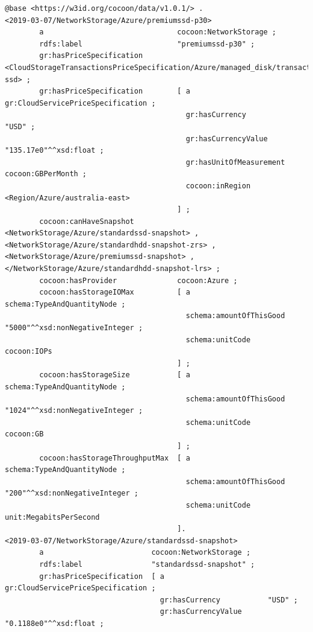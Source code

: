 \begin{lstlisting}[caption={Storage},label={lst:Storage}]
@base <https://w3id.org/cocoon/data/v1.0.1/> .
<2019-03-07/NetworkStorage/Azure/premiumssd-p30>
        a                               cocoon:NetworkStorage ;
        rdfs:label                      "premiumssd-p30" ;
        gr:hasPriceSpecification        <CloudStorageTransactionsPriceSpecification/Azure/managed_disk/transactions-ssd> ;
        gr:hasPriceSpecification        [ a                        gr:CloudServicePriceSpecification ;
                                          gr:hasCurrency           "USD" ;
                                          gr:hasCurrencyValue      "135.17e0"^^xsd:float ;
                                          gr:hasUnitOfMeasurement  cocoon:GBPerMonth ;
                                          cocoon:inRegion         <Region/Azure/australia-east>
                                        ] ;
        cocoon:canHaveSnapshot          <NetworkStorage/Azure/standardssd-snapshot> , <NetworkStorage/Azure/standardhdd-snapshot-zrs> , <NetworkStorage/Azure/premiumssd-snapshot> , </NetworkStorage/Azure/standardhdd-snapshot-lrs> ;
        cocoon:hasProvider              cocoon:Azure ;
        cocoon:hasStorageIOMax          [ a                        schema:TypeAndQuantityNode ;
                                          schema:amountOfThisGood  "5000"^^xsd:nonNegativeInteger ;
                                          schema:unitCode          cocoon:IOPs
                                        ] ;
        cocoon:hasStorageSize           [ a                        schema:TypeAndQuantityNode ;
                                          schema:amountOfThisGood  "1024"^^xsd:nonNegativeInteger ;
                                          schema:unitCode          cocoon:GB
                                        ] ;
        cocoon:hasStorageThroughputMax  [ a                        schema:TypeAndQuantityNode ;
                                          schema:amountOfThisGood  "200"^^xsd:nonNegativeInteger ;
                                          schema:unitCode          unit:MegabitsPerSecond
                                        ].
<2019-03-07/NetworkStorage/Azure/standardssd-snapshot>
        a                         cocoon:NetworkStorage ;
        rdfs:label                "standardssd-snapshot" ;
        gr:hasPriceSpecification  [ a                        gr:CloudServicePriceSpecification ;
                                    gr:hasCurrency           "USD" ;
                                    gr:hasCurrencyValue      "0.1188e0"^^xsd:float ;

\end{lstlisting}

